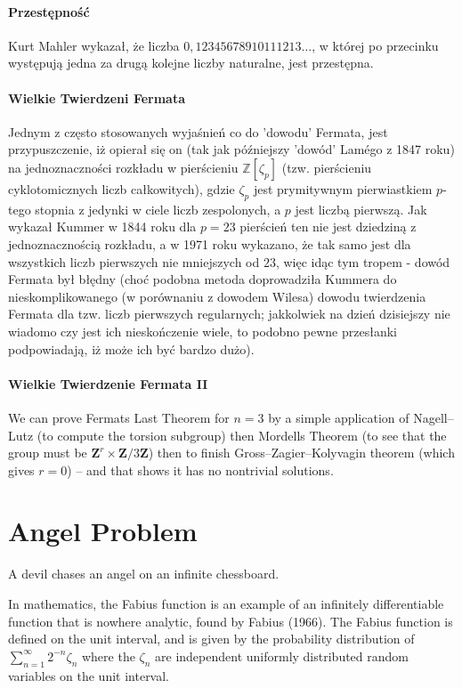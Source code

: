 \begin{parnumbers}
\paragraph{Przestępność} Kurt Mahler wykazał, że liczba $0,12345678910111213\dots$, w której po przecinku występują jedna za drugą kolejne liczby naturalne, jest przestępna.



\paragraph{Wielkie Twierdzeni Fermata} Jednym z często stosowanych wyjaśnień co do 'dowodu' Fermata, jest przypuszczenie, iż opierał się on (tak jak późniejszy 'dowód' Lamégo z 1847 roku) na jednoznaczności rozkładu w pierścieniu $\mathbb{Z}[\zeta_{p}]$ (tzw. pierścieniu cyklotomicznych liczb całkowitych), gdzie $\zeta_{p}$ jest prymitywnym pierwiastkiem $p$-tego stopnia z jedynki w ciele liczb zespolonych, a $p$ jest liczbą pierwszą. Jak wykazał Kummer w 1844 roku dla $p=23$ pierścień ten nie jest dziedziną z jednoznacznością rozkładu, a w 1971 roku wykazano, że tak samo jest dla wszystkich liczb pierwszych nie mniejszych od $23$, więc idąc tym tropem - dowód Fermata był błędny (choć podobna metoda doprowadziła Kummera do nieskomplikowanego (w porównaniu z dowodem Wilesa) dowodu twierdzenia Fermata dla tzw. liczb pierwszych regularnych; jakkolwiek na dzień dzisiejszy nie wiadomo czy jest ich nieskończenie wiele, to podobno pewne przesłanki podpowiadają, iż może ich być bardzo dużo).

\paragraph{Wielkie Twierdzenie Fermata II} We can prove Fermats Last Theorem for $n=3$ by a simple application of Nagell--Lutz (to compute the torsion subgroup) then Mordells Theorem (to see that the group must be $\mathbf{Z}^r \times \mathbf{Z}/3\mathbf{Z}$) then to finish Gross--Zagier--Kolyvagin theorem (which gives $r=0$) -- and that shows it has no nontrivial solutions.



\section{Angel Problem} A devil chases an angel on an infinite chessboard.

In mathematics, the Fabius function is an example of an infinitely differentiable function that is nowhere analytic, found by Fabius (1966). The Fabius function is defined on the unit interval, and is given by the probability distribution of $\sum_{n=1}^\infty 2^{-n} \zeta_n$ where the $\zeta_n$ are independent uniformly distributed random variables on the unit interval.


\end{parnumbers}
